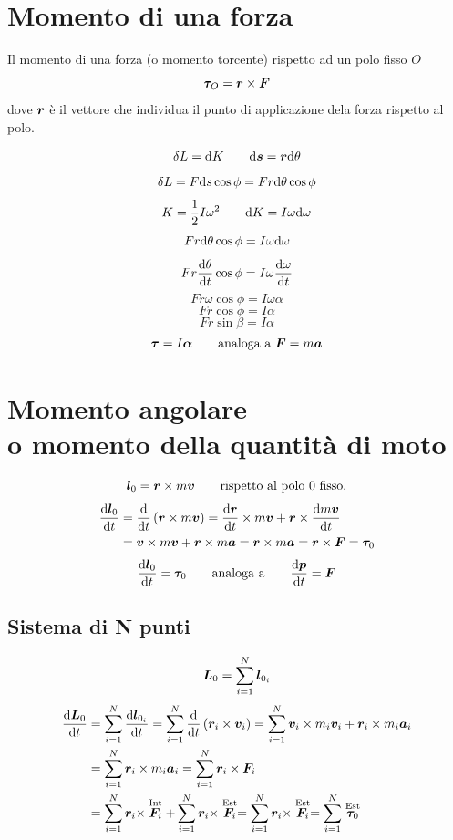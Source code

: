 \section{Momento di una forza}
\begin{Def}
  Il momento di una forza (o momento torcente) rispetto ad un polo fisso $O$
  \begin{equation}
    \boldsymbol{\tau}_O=\boldsymbol{r} \times \boldsymbol{F}
  \end{equation}
  dove $\boldsymbol{r}$ è il vettore che individua il punto di applicazione dela forza rispetto al polo.
\end{Def}
\[\delta L=\mathrm{d} K\qquad \mathrm{d} \boldsymbol{s}=\boldsymbol{r}\mathrm{d} \theta\]
\[\delta L=F\mathrm{d} s\cos \phi=Fr\mathrm{d}\theta\cos\phi\]
\[K=\frac{1}{2}I\omega^2\qquad\mathrm{d} K=I\omega\mathrm{d}\omega\]
\[Fr\mathrm{d}\theta\cos\phi=I\omega\mathrm{d}\omega\]
\[Fr\frac{\mathrm{d}\theta}{\mathrm{d} t}\cos\phi=I\omega\frac{\mathrm{d}\omega}{\mathrm{d}
    t}\]
\[Fr\omega\cos\phi=I\omega\alpha\]
\[Fr\cos\phi=I\alpha\]
\[Fr\sin\beta=I\alpha\]
\[\boldsymbol{\tau}=I\boldsymbol{\alpha}\qquad\text{analoga a $\boldsymbol{F}=m\boldsymbol{a}$}\]
\section[\index{momento!angolare}\index{momento!della quantità di moto}Momento angolare o della quantità di moto]{Momento angolare\\ o momento della quantità di moto}
\[\boldsymbol{l}_0=\boldsymbol{r}\times m\boldsymbol{v}\qquad\text{rispetto al polo $0$ fisso.}\]
\begin{align*}
  \frac{\mathrm{d} \boldsymbol{l}_0}{\mathrm{d} t} & =\frac{\mathrm{d}}{\mathrm{d} t}\left(\boldsymbol{r}\times m\boldsymbol{v}\right)= \frac{\mathrm{d}\boldsymbol{r}}{\mathrm{d} t}\times m\boldsymbol{v}+\boldsymbol{r}\times\frac{\mathrm{d} m\boldsymbol{v}}{\mathrm{d} t} \\
                            & =\boldsymbol{v}\times m\boldsymbol{v}+\boldsymbol{r} \times m\boldsymbol{a}=\boldsymbol{r}\times m\boldsymbol{a}=\boldsymbol{r}\times\boldsymbol{F}=\boldsymbol{\tau}_0
\end{align*}
\[\frac{\mathrm{d}\boldsymbol{l}_0}{\mathrm{d} t}=\boldsymbol{\tau}_0\qquad\text{analoga
    a}\qquad\frac{\mathrm{d} \boldsymbol{p}}{\mathrm{d} t}=\boldsymbol{F}\]
\subsection{Sistema di N punti}
\[\boldsymbol{L}_0=\sum_{i=1}^N \boldsymbol{l}_{0_i}\]
\begin{align*}\frac{\mathrm{d} \boldsymbol{L}_0}{\mathrm{d} t} & =\sum_{i=1}^{N}\frac{\mathrm{d} \boldsymbol{l}_{0_i}}{\mathrm{d}
                t}=\sum_{i=1}^{N}\frac{\mathrm{d}}{\mathrm{d} t}\left(\boldsymbol{r}_i \times \boldsymbol{v}_i\right)=\sum_{i=1}^{N}\boldsymbol{v}_i\times m_i \boldsymbol{v}_i+\boldsymbol{r}_i\times m_i\boldsymbol{a}_i                                                  \\
                                        & =\sum_{i=1}^{N}\boldsymbol{r}_i\times m_i\boldsymbol{a}_i=\sum_{i=1}^{N}\boldsymbol{r}_i\times\boldsymbol{F}_i                                \\
                                        & =\sum_{i=1}^{N}\boldsymbol{r}_i\times\stackrel{\text{Int}}{\boldsymbol{F}_i}+\sum_{i=1}^{N}\boldsymbol{r}_i\times\stackrel{\text{Est}}{\boldsymbol{F}_i}=\sum_{i=1}^{N}\boldsymbol{r}_i\times \stackrel{\text{Est}}{\boldsymbol{F}_i}=\sum_{i=1}^{N}\stackrel{\text{Est}}{\boldsymbol{\tau}_0}\end{align*}
